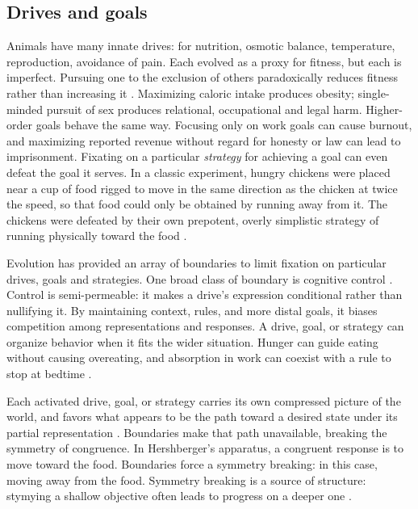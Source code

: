 \documentclass[11pt]{article}
\begin{document}


\subsection{Drives and goals} 

Animals have many innate drives: for nutrition, osmotic balance, temperature, reproduction, avoidance of pain. Each evolved as a proxy for fitness, but each is imperfect. Pursuing one to the exclusion of others paradoxically reduces fitness rather than increasing it \citep{kurthnelson2024dynamic, john2023dead, mcfarland1975behavioural}. Maximizing caloric intake produces obesity; single-minded pursuit of sex produces relational, occupational and legal harm. Higher-order goals behave the same way. Focusing only on work goals can cause burnout, and maximizing reported revenue without regard for honesty or law can lead to imprisonment. Fixating on a particular \textit{strategy} for achieving a goal can even defeat the goal it serves. In a classic experiment, hungry chickens were placed near a cup of food rigged to move in the same direction as the chicken at twice the speed, so that food could only be obtained by running away from it. The chickens were defeated by their own prepotent, overly simplistic strategy of running physically toward the food \citep{hershberger1986approach, dayan2006misbehavior}.

Evolution has provided an array of boundaries to limit fixation on particular drives, goals and strategies. One broad class of boundary is cognitive control \citep{botvinick2001conflict, diamond2013executive}. Control is semi-permeable: it makes a drive's expression conditional rather than nullifying it. By maintaining context, rules, and more distal goals, it biases competition among representations and responses. A drive, goal, or strategy can organize behavior when it fits the wider situation. Hunger can guide eating without causing overeating, and absorption in work can coexist with a rule to stop at bedtime \citep{miller2001integrative,braver2012variable}.

Each activated drive, goal, or strategy carries its own compressed picture of the world, and favors what appears to be the path toward a desired state under its partial representation \citep{miller1960plans, carver2001self}. Boundaries make that path unavailable, breaking the symmetry of congruence. In Hershberger's apparatus, a congruent response is to move toward the food. Boundaries force a symmetry breaking: in this case, moving away from the food. Symmetry breaking is a source of structure: stymying a shallow objective often leads to progress on a deeper one \citep{anderson1972more, duncker1945on, rosenberg1969direction, stokes2005creativity, ohlsson1992information}.
\end{document}
